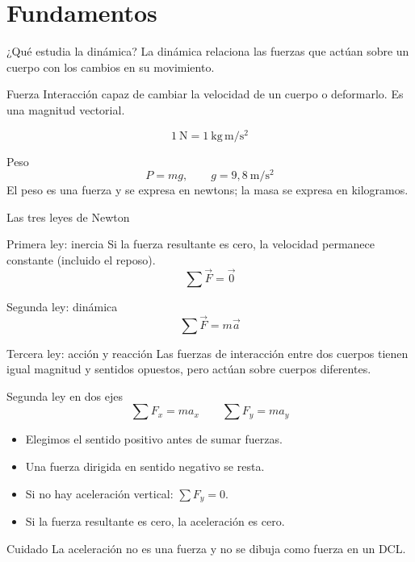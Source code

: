 \documentclass[aspectratio=169,11pt]{beamer}
\begin{document}
\section{Fundamentos}
\begin{frame}{¿Qué estudia la dinámica?}
La dinámica relaciona las fuerzas que actúan sobre un cuerpo con los cambios en su movimiento.
\begin{block}{Fuerza}
Interacción capaz de cambiar la velocidad de un cuerpo o deformarlo. Es una magnitud vectorial.
\end{block}
\[1\ \mathrm{N}=1\ \mathrm{kg\,m/s^2}\]
\begin{block}{Peso}
\[P=mg,\qquad g=9{,}8\ \mathrm{m/s^2}\]
El peso es una fuerza y se expresa en newtons; la masa se expresa en kilogramos.
\end{block}
\end{frame}
\begin{frame}{Las tres leyes de Newton}
\begin{block}{Primera ley: inercia}
Si la fuerza resultante es cero, la velocidad permanece constante (incluido el reposo).
\[\sum\vec F=\vec 0\]
\end{block}
\begin{block}{Segunda ley: dinámica}
\[\boxed{\sum\vec F=m\vec a}\]
\end{block}
\begin{block}{Tercera ley: acción y reacción}
Las fuerzas de interacción entre dos cuerpos tienen igual magnitud y sentidos opuestos, pero actúan sobre cuerpos diferentes.
\end{block}
\end{frame}
\begin{frame}{Segunda ley en dos ejes}
\[\boxed{\sum F_x=ma_x}\qquad\boxed{\sum F_y=ma_y}\]
\begin{itemize}
\item Elegimos el sentido positivo antes de sumar fuerzas.
\item Una fuerza dirigida en sentido negativo se resta.
\item Si no hay aceleración vertical: \(\sum F_y=0\).
\item Si la fuerza resultante es cero, la aceleración es cero.
\end{itemize}
\begin{alertblock}{Cuidado}
La aceleración no es una fuerza y no se dibuja como fuerza en un DCL.
\end{alertblock}
\end{frame}
\end{document}
